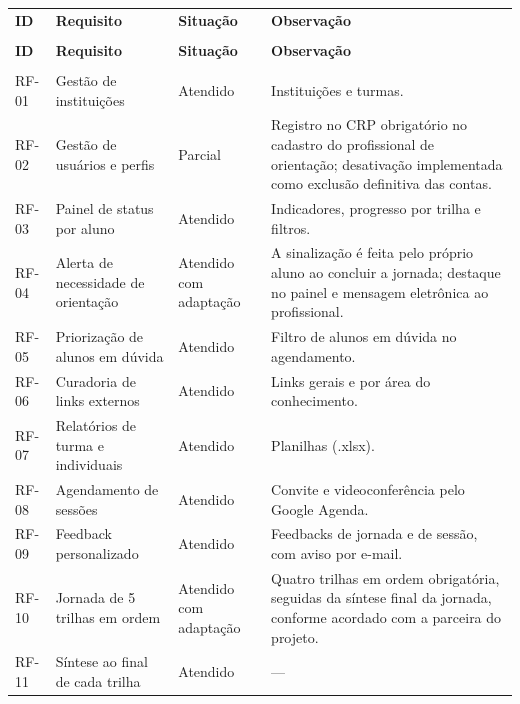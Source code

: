 {\ABNTEXfontereduzida
\renewcommand{\arraystretch}{1.25}
\begin{xltabular}{\textwidth}{|>{\raggedright\arraybackslash}p{1.8cm}|>{\raggedright\arraybackslash}p{4.7cm}|>{\raggedright\arraybackslash}p{2.5cm}|>{\raggedright\arraybackslash}X|}
 \\[0.3em]
\hline
\textbf{ID} & \textbf{Requisito} & \textbf{Situação} & \textbf{Observação} \\
\hline
\endfirsthead
{} \\
\hline
\textbf{ID} & \textbf{Requisito} & \textbf{Situação} & \textbf{Observação} \\
\hline
\endhead
{} \\
\endfoot
\endlastfoot
RF-01 & Gestão de instituições & Atendido & Instituições e turmas. \\
\hline
RF-02 & Gestão de usuários e perfis & Parcial & Registro no CRP obrigatório no cadastro do profissional de orientação; desativação implementada como exclusão definitiva das contas. \\
\hline
RF-03 & Painel de status por aluno & Atendido & Indicadores, progresso por trilha e filtros. \\
\hline
RF-04 & Alerta de necessidade de orientação & Atendido com adaptação & A sinalização é feita pelo próprio aluno ao concluir a jornada; destaque no painel e mensagem eletrônica ao profissional. \\
\hline
RF-05 & Priorização de alunos em dúvida & Atendido & Filtro de alunos em dúvida no agendamento. \\
\hline
RF-06 & Curadoria de links externos & Atendido & Links gerais e por área do conhecimento. \\
\hline
RF-07 & Relatórios de turma e individuais & Atendido & Planilhas (.xlsx). \\
\hline
RF-08 & Agendamento de sessões & Atendido & Convite e videoconferência pelo Google Agenda. \\
\hline
RF-09 & Feedback personalizado & Atendido & Feedbacks de jornada e de sessão, com aviso por e-mail. \\
\hline
RF-10 & Jornada de 5 trilhas em ordem & Atendido com adaptação & Quatro trilhas em ordem obrigatória, seguidas da síntese final da jornada, conforme acordado com a parceira do projeto. \\
\hline
RF-11 & Síntese ao final de cada trilha & Atendido & — \\

\end{xltabular}}

